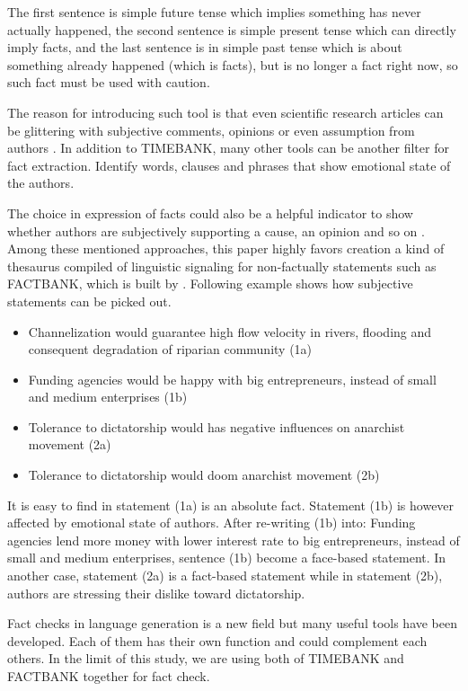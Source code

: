 The first sentence is simple future tense which implies something has never actually happened, the second sentence is simple present tense which can directly imply facts,
and the last sentence is in simple past tense which is about something already happened (which is facts),
but is no longer a fact right now, so such fact must be used with caution. 

The reason for introducing such tool is that even scientific research articles can be glittering with subjective comments, opinions or even assumption from authors \cite{schultze2000confessional}. 
In addition to TIMEBANK, many other tools can be another filter for fact extraction. 
\cite{Dave2003mining} Identify words, clauses and phrases that show emotional state of the authors. 

The choice in expression of facts could also be a helpful indicator to show whether authors are subjectively supporting a cause, an opinion and so on \cite{Wiebe2005}. 
Among these mentioned approaches, this paper highly favors creation a kind of thesaurus compiled of linguistic signaling for non-factually statements such as FACTBANK,
which is built by \cite{Sauri2009}. 
Following example shows how subjective statements can be picked out.

\begin{itemize}
	\item Channelization would guarantee high flow velocity in rivers, flooding and consequent degradation of riparian community (1a)
	\item Funding agencies would be happy with big entrepreneurs, instead of small and medium enterprises (1b)
	\item Tolerance to dictatorship would has negative influences on anarchist movement (2a)
	\item Tolerance to dictatorship would doom anarchist movement (2b)
\end{itemize}

It is easy to find in statement (1a) is an absolute fact. 
Statement (1b) is however affected by emotional state of authors. 
After re-writing (1b) into: Funding agencies lend more money with lower interest rate to big entrepreneurs, instead of small 
and medium enterprises,
sentence (1b) become a face-based statement. 
In another case, statement (2a) is a fact-based statement while in statement (2b), authors are stressing their dislike toward dictatorship.

Fact checks in language generation is a new field but many useful tools have been developed. 
Each of them has their own function and could complement each others. 
In the limit of this study, we are using both of TIMEBANK and FACTBANK together for fact check.



